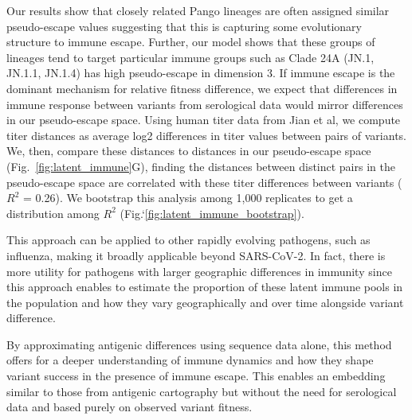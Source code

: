 \documentclass[11pt,oneside,letterpaper]{article}
\def\tbc#1{\textcolor{purple}{[#1]}}
\begin{document}
Our results show that closely related Pango lineages are often assigned similar pseudo-escape values suggesting that this is capturing some evolutionary structure to immune escape.
Further, our model shows that these groups of lineages tend to target particular immune groups such as Clade 24A (JN.1, JN.1.1, JN.1.4) has high pseudo-escape in dimension 3.
If immune escape is the dominant mechanism for relative fitness difference, we expect that differences in immune response between variants from serological data would mirror differences in our pseudo-escape space.
Using human titer data from Jian et al, we compute titer distances as average log2 differences in titer values between pairs of variants. \cite{Jian2023} 
We, then, compare these distances to distances in our pseudo-escape space (Fig.~\ref{fig:latent_immune}G), finding the distances between distinct pairs in the pseudo-escape space are correlated with these titer differences between variants ($R^2$ = 0.26).
We bootstrap this analysis among 1,000 replicates to get a distribution among $R^2$ (Fig.`\ref{fig:latent_immune_bootstrap}).

 This approach can be applied to other rapidly evolving pathogens, such as influenza, making it broadly applicable beyond SARS-CoV-2.
 In fact, there is more utility for pathogens with larger geographic differences in immunity since this approach enables to estimate the proportion of these latent immune pools in the population and how they vary geographically and over time alongside variant difference.

By approximating antigenic differences using sequence data alone, this method offers for a deeper understanding of immune dynamics and how they shape variant success in the presence of immune escape.
This enables an embedding similar to those from antigenic cartography but without the need for serological data and based purely on observed variant fitness.

\end{document}
